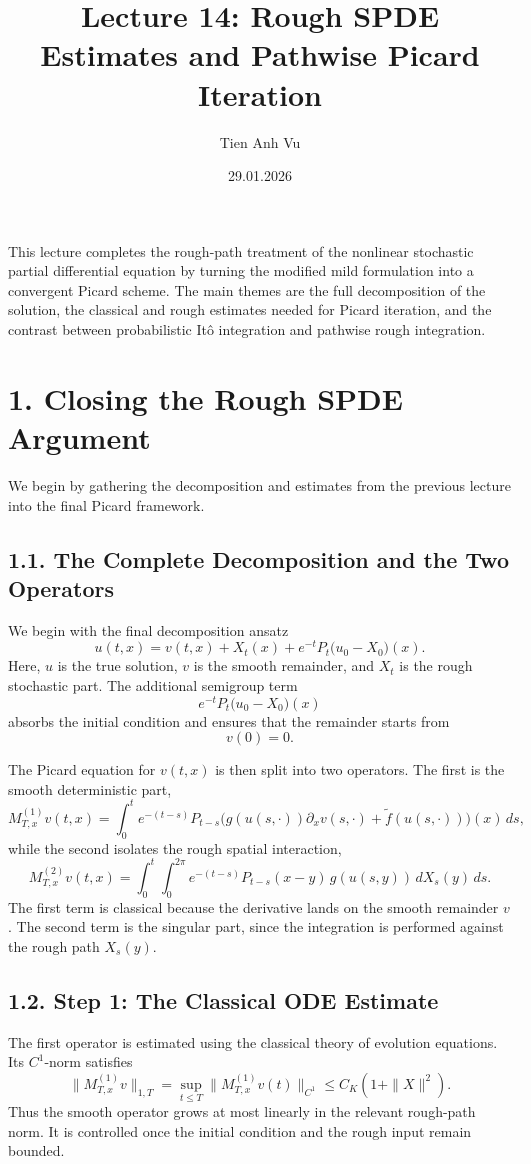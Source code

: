 \documentclass[11pt]{article}
\title{Lecture 14: Rough SPDE Estimates and Pathwise Picard Iteration}
\date{29.01.2026}
\author{Tien Anh Vu}
\theoremstyle{definition}
\theoremstyle{remark}
\begin{document}
\maketitle

This lecture completes the rough-path treatment of the nonlinear stochastic partial differential equation by turning the modified mild formulation into a convergent Picard scheme. The main themes are the full decomposition of the solution, the classical and rough estimates needed for Picard iteration, and the contrast between probabilistic It\^o integration and pathwise rough integration.

\section*{1. Closing the Rough SPDE Argument}
We begin by gathering the decomposition and estimates from the previous lecture into the final Picard framework.

\subsection*{1.1. The Complete Decomposition and the Two Operators}
We begin with the final decomposition ansatz
\[
u(t,x)=v(t,x)+X_t(x)+e^{-t}P_t\bigl(u_0-X_0\bigr)(x).
\]
Here, \(u\) is the true solution, \(v\) is the smooth remainder, and \(X_t\) is the rough stochastic part. The additional semigroup term
\[
e^{-t}P_t\bigl(u_0-X_0\bigr)(x)
\]
absorbs the initial condition and ensures that the remainder starts from
\[
v(0)=0.
\]

The Picard equation for \(v(t,x)\) is then split into two operators. The first is the smooth deterministic part,
\[
M^{(1)}_{T,x}v(t,x)
=
\int_0^t e^{-(t-s)}P_{t-s}
\bigl(g(u(s,\cdot))\partial_x v(s,\cdot)+\widetilde f(u(s,\cdot))\bigr)(x)\,ds,
\]
while the second isolates the rough spatial interaction,
\[
M^{(2)}_{T,x}v(t,x)
=
\int_0^t\int_0^{2\pi}
e^{-(t-s)}P_{t-s}(x-y)\,g(u(s,y))\,dX_s(y)\,ds.
\]
The first term is classical because the derivative lands on the smooth remainder \(v\). The second term is the singular part, since the integration is performed against the rough path \(X_s(y)\).

\subsection*{1.2. Step 1: The Classical ODE Estimate}
The first operator is estimated using the classical theory of evolution equations. Its \(C^1\)-norm satisfies
\[
\|M^{(1)}_{T,x}v\|_{1,T}
=
\sup_{t\le T}\|M^{(1)}_{T,x}v(t)\|_{C^1}
\le
C_K(1+\|X\|^2).
\]
Thus the smooth operator grows at most linearly in the relevant rough-path norm. It is controlled once the initial condition and the rough input remain bounded.
\end{document}
